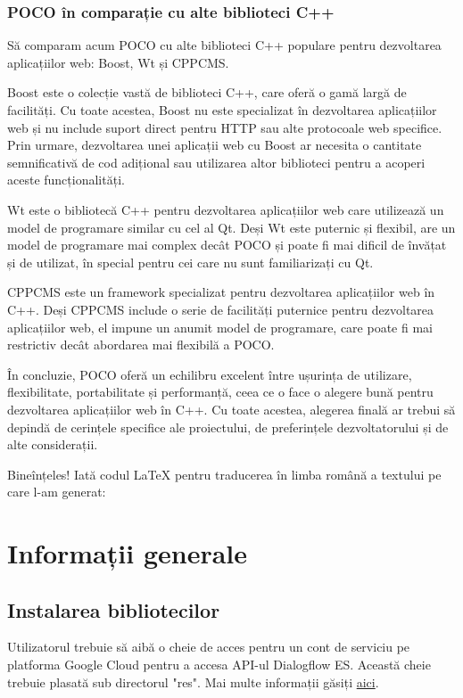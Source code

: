 \subsection{POCO în comparație cu alte biblioteci C++}

Să comparam acum POCO cu alte biblioteci C++ populare pentru dezvoltarea aplicațiilor web: Boost, Wt și CPPCMS.

Boost este o colecție vastă de biblioteci C++, care oferă o gamă largă de facilități. Cu toate acestea, Boost nu este specializat în dezvoltarea aplicațiilor web și nu include suport direct pentru HTTP sau alte protocoale web specifice. Prin urmare, dezvoltarea unei aplicații web cu Boost ar necesita o cantitate semnificativă de cod adițional sau utilizarea altor biblioteci pentru a acoperi aceste funcționalități.

Wt este o bibliotecă C++ pentru dezvoltarea aplicațiilor web care utilizează un model de programare similar cu cel al Qt. Deși Wt este puternic și flexibil, are un model de programare mai complex decât POCO și poate fi mai dificil de învățat și de utilizat, în special pentru cei care nu sunt familiarizați cu Qt.

CPPCMS este un framework specializat pentru dezvoltarea aplicațiilor web în C++. Deși CPPCMS include o serie de facilități puternice pentru dezvoltarea aplicațiilor web, el impune un anumit model de programare, care poate fi mai restrictiv decât abordarea mai flexibilă a POCO.

În concluzie, POCO oferă un echilibru excelent între ușurința de utilizare, flexibilitate, portabilitate și performanță, ceea ce o face o alegere bună pentru dezvoltarea aplicațiilor web în C++. Cu toate acestea, alegerea finală ar trebui să depindă de cerințele specifice ale proiectului, de preferințele dezvoltatorului și de alte considerații.

Bineînțeles! Iată codul LaTeX pentru traducerea în limba română a textului pe care l-am generat:

\chapter{Informații generale}

\section{Instalarea bibliotecilor}
Utilizatorul trebuie să aibă o cheie de acces pentru un cont de serviciu pe platforma Google Cloud pentru a accesa API-ul Dialogflow ES. Această cheie trebuie plasată sub directorul "res". Mai multe informații găsiți \href{https://cloud.google.com/iam/docs/keys-create-delete}{aici}.

